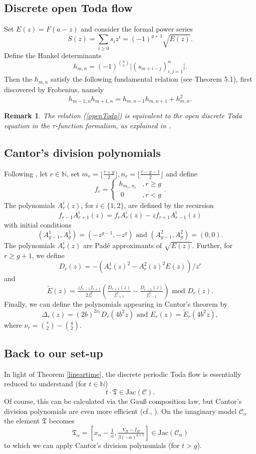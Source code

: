 \documentclass[11pt, a4paper]{amsart}
\newcommand{\jac}{\mathrm{Jac(\mathcal C)}}
\newcommand{\eq}[1]{\begin{equation}#1 \end{equation}}
\newcommand{\eqst}[1]{\begin{equation*}#1\end{equation*}}
\theoremstyle{plain}
\newtheorem{remark}{Remark}[section]
\numberwithin{equation}{section}
\begin{document}
\subsection{Discrete open Toda flow}
Set $E(z) = F(a-z)$ and consider the formal power series \eqst{S(z) = \sum_{i\geq 0} s_i z^i = (-1)^{g+1} \sqrt{E(z)}.} Define the Hankel determinants \eqst{h_{m,n} = (-1)^{\binom{n}{2}}\vert (s_{m+i-j})_{i,j=1}^n \vert.}
Then the $h_{m,n}$ satisfy the following fundamental relation (see \cite{gragg} Theorem 5.1), first discovered by Frobenius, namely \eq{\label{openToda}h_{m-1,n}h_{m+1,n}=h_{m,n-1}h_{m,n+1}+h_{m,n}^2.}
\begin{remark}
The relation (\ref{openToda}) is equivalent to the open discrete Toda equation in the $\tau$-function formalism, as explained in \cite{gragg,faybusovich}.
\end{remark}
\subsection{Cantor's division polynomials}
Following \cite{cantordivision}, let $r \in \mathbb N$, set $m_r = \lfloor \tfrac{r+g}{2} \rfloor ,n_r = \lfloor \tfrac{r-g-1}{2}\rfloor$ and define 
\eqst{f_r = \left\{ \begin{array}{cc}  h_{m_r,n_r} & ,r \geq g \\  \  0 & , r<g  \end{array} .\right.}
The polynomials $A^i_r(z)$, for $i \in \{1,2\}$, are defined by the recursion \eqst{f_{r-1}A^i_{r+1}(z) = f_r A^i_r(z)-zf_{r+1}A^i_{r-1}(z)} with initial conditions \eqst{(A^1_{g-1},A^1_g) = (-z^{g-1},-z^g) \text{ and } (A^2_{g-1},A^2_g) = (0,0).}
The polynomials $A^i_r(z)$ are Padé approximants of $\sqrt{E(z)}$.
Further, for $r\geq g+1$, we define \eqst{D_r(z) = -(A^1_r(z)^2 - A^2_r(z)^2 E(z))/z^r} and \eqst{\tilde E (z) = \tfrac{z f_{r-1}f_{r+1}}{2 f_r^2}(\tfrac{D_{r+1}(z)}{f_{r+1}^2}-\tfrac{D_{r-1}(z)}{f_{r-1}^2}) \text{ mod } D_r(z).}
Finally, we can define the polynomials appearing in Cantor's theorem by \eqst{\Delta_r(z) = (2b)^{2\nu_r} D_r(4b^2 z) \text{ and } E_r(z) = \tilde E_r(4 b^2 z),} where $\nu_r = \binom{r}{2}-\binom{g}{2}.$

\subsection{Back to our set-up}
In light of Theorem \ref{lineartime}, the discrete periodic Toda flow is essentially reduced to understand (for $t \in \mathbb N$) \eqst{t \cdot \mathfrak T \in \jac.} Of course, this can be calculated via the Gauß composition law, but Cantor's division polynomials are even more efficient (cf., \cite{cantordivision}). On the imaginary model $\mathcal C _\alpha$ the element $\mathfrak T$ becomes \eqst{\mathfrak T _\alpha = [x_\alpha-\tfrac 1 \alpha, \tfrac{V_{\Pi}-I_{\Pi}}{\beta (-\alpha)^{g+1}}] \in \mathrm{Jac}(\mathcal C _\alpha)} to which we can apply Cantor's division polynomials (for $t > g$). 
\end{document}
